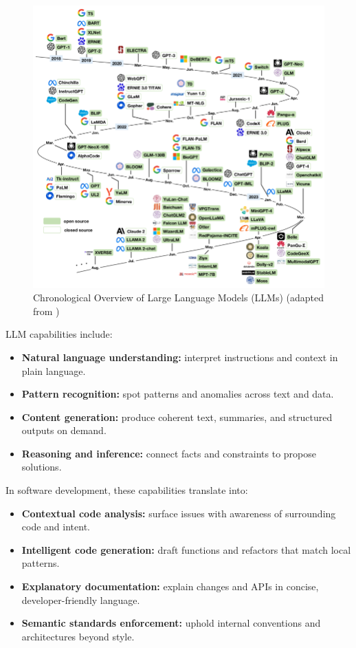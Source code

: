 \begin{spacing}{1.2}
\begin{figure}[H]
\centering
\includegraphics[scale=1]{Images/A-chronological-overview-of-large-language-models-LLMs-multimodal-and-scientific.png}
\caption{Chronological Overview of Large Language Models (LLMs) (adapted from \cite{gao2023gptsurvey})}
\label{fig:llm_overview}
\end{figure}

LLM capabilities include:

\begin{itemize}
\item \textbf{Natural language understanding:} interpret instructions and context in plain language.
\item \textbf{Pattern recognition:} spot patterns and anomalies across text and data.
\item \textbf{Content generation:} produce coherent text, summaries, and structured outputs on demand.
\item \textbf{Reasoning and inference:} connect facts and constraints to propose solutions.
\end{itemize}

In software development, these capabilities translate into:

\begin{itemize}
\item \textbf{Contextual code analysis:} surface issues with awareness of surrounding code and intent.
\item \textbf{Intelligent code generation:} draft functions and refactors that match local patterns.
\item \textbf{Explanatory documentation:} explain changes and APIs in concise, developer-friendly language.
\item \textbf{Semantic standards enforcement:} uphold internal conventions and architectures beyond style.
\end{itemize}


\end{spacing}
